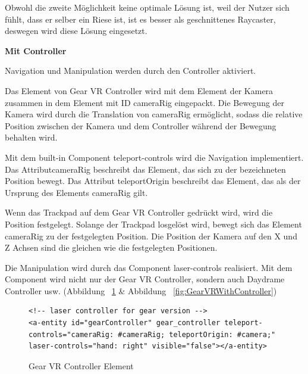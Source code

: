  Obwohl die zweite Möglichkeit keine optimale Lösung ist, weil der Nutzer sich fühlt, dass er selber ein Riese ist, ist es besser als geschnittenes Raycaster, deswegen wird diese Lösung eingesetzt. 
  
  \vspace{1em}
  \noindent
  \textbf{Mit Controller}
  \vspace{1em}
  
  \noindent
  Navigation und Manipulation werden durch den Controller aktiviert.
  
  Das Element von Gear VR Controller wird mit dem Element der Kamera zusammen in dem Element mit ID {\selectfont cameraRig} eingepackt. Die Bewegung der Kamera wird durch die Translation von {\selectfont cameraRig} ermöglicht, sodass die relative Position zwischen der Kamera und dem Controller während der Bewegung behalten wird.
  
  Mit dem built-in Component {\selectfont teleport-controls} wird die Navigation implementiert. Das Attribut{\selectfont cameraRig} beschreibt das Element, das sich zu der bezeichneten Position bewegt. Das Attribut {\selectfont teleportOrigin} beschreibt das Element, das als der Ursprung des Elements {\selectfont cameraRig} gilt.
  
  Wenn das Trackpad auf dem Gear VR Controller gedrückt wird, wird die Position festgelegt. Solange der Trackpad losgelöst wird, bewegt sich das Element {\selectfont cameraRig} zu der festgelegten Position. Die Position der Kamera auf den X und Z Achsen sind die gleichen wie die festgelegten Positionen.
  
  Die Manipulation wird durch das Component {\selectfont laser-controls} realisiert. Mit dem Component wird nicht nur der Gear VR Controller, sondern auch Daydrame Controller usw. (Abbildung ~\ref{fig:GearVRControllerElement} \& Abbildung ~\ref{fig:GearVRWithController})
  
\begin{figure}[ht]
\vspace*{1em}
\centering
\caption[Gear VR Controller Element]{Gear VR Controller Element}
\begin{lstlisting}[language=HTML5, style=htmlcssjs]
<!-- laser controller for gear version -->
<a-entity id="gearController" gear_controller teleport-controls="cameraRig: #cameraRig; teleportOrigin: #camera;" laser-controls="hand: right" visible="false"></a-entity>
\end{lstlisting}
\label{fig:GearVRControllerElement} 
\end{figure}
  
